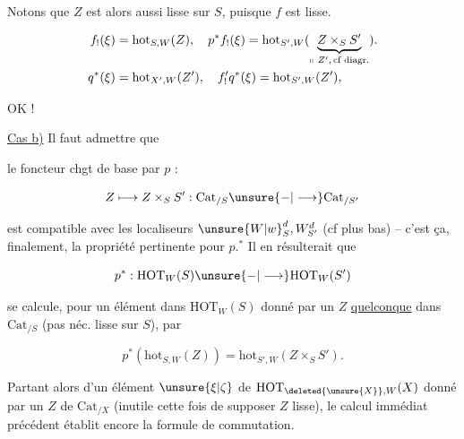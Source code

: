 Notons que $Z$ est alors aussi lisse sur $S$, puisque $f$ est lisse.

\[
\begin{aligned}
 f_!(\xi)&=\mathrm{hot}_{S,W}(Z),\quad p^*f_!(\xi)=\mathrm{hot}_{S',W}(\underbrace{Z\times_S S'}_{\shortparallel\ Z',\,\text{cf diagr.}}).\\
 q^*(\xi)&=\mathrm{hot}_{X',W}(Z'),\quad f'_!q^*(\xi)=\mathrm{hot}_{S',W}(Z'),
\end{aligned}
\]


OK !

\uline{Cas b)} Il faut admettre que


le foncteur chgt de base par $p$ : 

\[
 Z\longmapsto Z\times_S S':\mathrm{Cat}_{/S}\unsure{\mathord{-}|\longrightarrow}\mathrm{Cat}_{/S'}
\]

est compatible avec les localiseurs $\unsure{W|w}_S^d,W_{S'}^d$ (cf plus bas) -- c'est ça, finalement, la propriété pertinente pour $p$.$^*$ Il en résulterait que


\[
 p^*:\mathrm{HOT}_W(S)\unsure{\mathord{-}|\longrightarrow}\mathrm{HOT}_W(S')
\]

se calcule, pour un élément dans $\mathrm{HOT}_W(S)$ donné par un $Z$ \uline{quelconque} dans $\mathrm{Cat}_{/S}$ (pas néc. lisse sur $S$), par

\[
 p^*(\mathrm{hot}_{S,W}(Z))=\mathrm{hot}_{S',W}(Z\times_S S').
\]

Partant alors  d'un élément $\unsure{\xi|\zeta}$ de $\mathrm{HOT}_{\deleted{\unsure{X}},W}(X)$ donné par un $Z$ de $\mathrm{Cat}_{/X}$ (inutile cette fois de supposer $Z$ lisse), le calcul immédiat précédent établit encore la formule de commutation.

